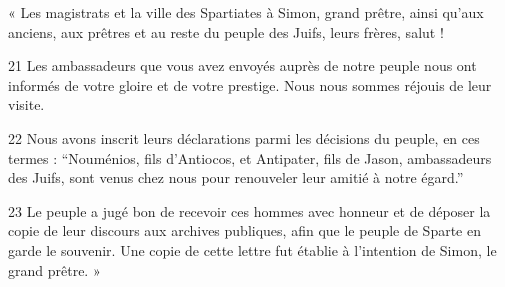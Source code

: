 « Les magistrats et la ville des Spartiates à Simon, grand prêtre, ainsi qu’aux anciens, aux prêtres et au reste du peuple des Juifs, leurs frères, salut !

21 Les ambassadeurs que vous avez envoyés auprès de notre peuple nous ont informés de votre gloire et de votre prestige. Nous nous sommes réjouis de leur visite.

22 Nous avons inscrit leurs déclarations parmi les décisions du peuple, en ces termes : “Nouménios, fils d’Antiocos, et Antipater, fils de Jason, ambassadeurs des Juifs, sont venus chez nous pour renouveler leur amitié à notre égard.”

23 Le peuple a jugé bon de recevoir ces hommes avec honneur et de déposer la copie de leur discours aux archives publiques, afin que le peuple de Sparte en garde le souvenir. Une copie de cette lettre fut établie à l’intention de Simon, le grand prêtre. »
